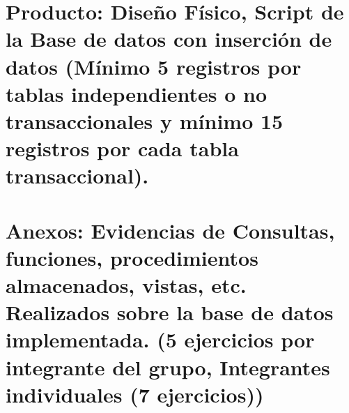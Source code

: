 \documentclass[10pt]{article}
\begin{document}
\section{Producto: Diseño Físico, Script de la Base de datos con inserción de datos (Mínimo 5 registros por tablas independientes o no transaccionales y mínimo 15 registros por cada tabla transaccional).}

\section{Anexos: Evidencias de Consultas, funciones, procedimientos almacenados, vistas, etc. Realizados sobre la base de datos implementada. (5 ejercicios por integrante del grupo, Integrantes individuales (7 ejercicios))}
\end{document}
